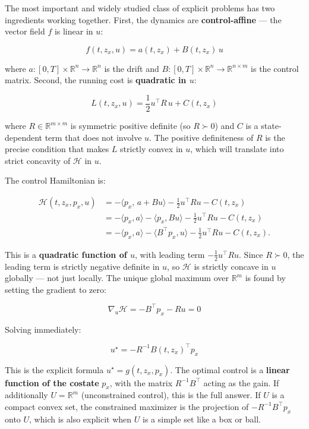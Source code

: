 \documentclass{article}
\begin{document}
\begin{examplebox}
The most important and widely studied class of explicit problems has two ingredients working together. First, the dynamics are \textbf{control-affine} — the vector field $f$ is linear in $u$:

$$f(t, z_x, u) = a(t, z_x) + B(t, z_x)\, u$$

where $a : [0,T] \times \mathbb{R}^n \to \mathbb{R}^n$ is the drift and $B : [0,T] \times \mathbb{R}^n \to \mathbb{R}^{n \times m}$ is the control matrix. Second, the running cost is \textbf{quadratic in $u$}:

$$L(t, z_x, u) = \frac{1}{2} u^\top R\, u + C(t, z_x)$$

where $R \in \mathbb{R}^{m \times m}$ is symmetric positive definite (so $R \succ 0$) and $C$ is a state-dependent term that does not involve $u$. The positive definiteness of $R$ is the precise condition that makes $L$ strictly convex in $u$, which will translate into strict concavity of $\mathcal{H}$ in $u$.

The control Hamiltonian is:

\begin{align*}
\mathcal{H}(t, z_x, p_x, u)
&= -\langle p_x,\, a + Bu \rangle - \frac{1}{2} u^\top R u - C(t, z_x) \\
&= -\langle p_x, a \rangle - \langle p_x, Bu \rangle - \frac{1}{2} u^\top R u - C(t, z_x) \\
&= -\langle p_x, a \rangle - \langle B^\top p_x, u \rangle - \frac{1}{2} u^\top R u - C(t, z_x) .
\end{align*}

This is a \textbf{quadratic function of $u$}, with leading term $-\frac{1}{2} u^\top R u$. Since $R \succ 0$, the leading term is strictly negative definite in $u$, so $\mathcal{H}$ is strictly concave in $u$ globally — not just locally. The unique global maximum over $\mathbb{R}^m$ is found by setting the gradient to zero:

$$\nabla_u \mathcal{H} = -B^\top p_x - Ru = 0$$

Solving immediately:

$$u^\star = -R^{-1} B(t, z_x)^\top p_x$$

This is the explicit formula $u^\star = g(t, z_x, p_x)$. The optimal control is a \textbf{linear function of the costate} $p_x$, with the matrix $R^{-1} B^\top$ acting as the gain. If additionally $U = \mathbb{R}^m$ (unconstrained control), this is the full answer. If $U$ is a compact convex set, the constrained maximizer is the projection of $-R^{-1}B^\top p_x$ onto $U$, which is also explicit when $U$ is a simple set like a box or ball.
\end{examplebox}
\end{document}
